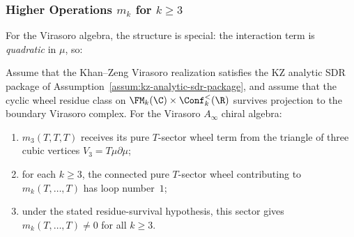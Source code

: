 \subsubsection{Higher Operations $m_k$ for $k \geq 3$}

For the Virasoro algebra, the structure is special: the interaction term is \emph{quadratic} in $\mu$, so:

\begin{proposition}
Assume that the Khan--Zeng Virasoro realization satisfies the KZ
analytic SDR package of
Assumption~\textup{\ref{assum:kz-analytic-sdr-package}}, and assume
that the cyclic wheel residue class on
$\FM_k(\C)\times\Conf_k^{<}(\R)$ survives projection to the boundary
Virasoro complex.
For the Virasoro $A_\infty$ chiral algebra:
\begin{enumerate}
\item $m_3(T, T, T)$ receives its pure $T$-sector wheel term from the
triangle of three cubic vertices $V_3=T\mu\partial\mu$;
\item for each $k \ge 3$, the connected pure $T$-sector wheel
contributing to $m_k(T,\ldots,T)$ has loop number~$1$;
\item under the stated residue-survival hypothesis, this sector gives
$m_k(T,\ldots,T)\ne0$ for all $k \ge 3$.
\end{enumerate}
\end{proposition}

